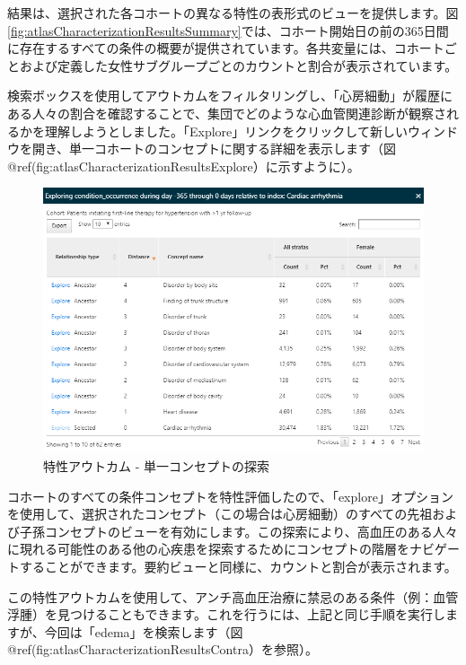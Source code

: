 \documentclass[
  11pt]{book}
\theoremstyle{definition}
\theoremstyle{definition}
\theoremstyle{definition}
\theoremstyle{definition}
\theoremstyle{remark}
\begin{document}
結果は、選択された各コホートの異なる特性の表形式のビューを提供します。図 \ref{fig:atlasCharacterizationResultsSummary}では、コホート開始日の前の365日間に存在するすべての条件の概要が提供されています。各共変量には、コホートごとおよび定義した女性サブグループごとのカウントと割合が表示されています。

検索ボックスを使用してアウトカムをフィルタリングし、「心房細動」が履歴にある人々の割合を確認することで、集団でどのような心血管関連診断が観察されるかを理解しようとしました。「Explore」リンクをクリックして新しいウィンドウを開き、単一コホートのコンセプトに関する詳細を表示します（図 @ref(fig:atlasCharacterizationResultsExplore）に示すように）。

\begin{figure}

{\centering \includegraphics[width=1\linewidth]{images/Characterization/atlasCharacterizationResultsExplore} 

}

\caption{特性アウトカム - 単一コンセプトの探索}\label{fig:atlasCharacterizationResultsExplore}
\end{figure}

コホートのすべての条件コンセプトを特性評価したので、「explore」オプションを使用して、選択されたコンセプト（この場合は心房細動）のすべての先祖および子孫コンセプトのビューを有効にします。この探索により、高血圧のある人々に現れる可能性のある他の心疾患を探索するためにコンセプトの階層をナビゲートすることができます。要約ビューと同様に、カウントと割合が表示されます。

この特性アウトカムを使用して、アンチ高血圧治療に禁忌のある条件（例：血管浮腫）を見つけることもできます。これを行うには、上記と同じ手順を実行しますが、今回は「edema」を検索します（図 @ref(fig:atlasCharacterizationResultsContra）を参照）。
\end{document}
